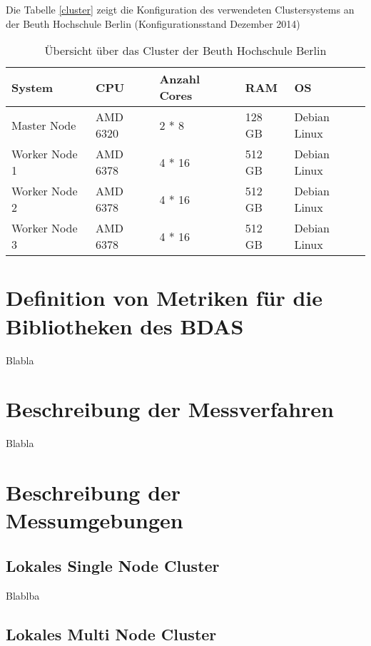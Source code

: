 Die Tabelle \ref{cluster} zeigt die Konfiguration des verwendeten Clustersystems an der Beuth Hochschule Berlin (Konfigurationsstand Dezember 2014)

\begin{table}[!ht]
\centering
\begin{tabular}{| p{3cm} | p{2.2cm} |  p{3cm} |  p{1.2cm} | p{3cm} | }
\hline
System & CPU & Anzahl Cores & RAM & OS\\ \hline \hline
Master Node & AMD 6320 & 2 * 8  & 128 GB & Debian Linux \\ \hline
Worker Node 1 & AMD 6378 & 4 * 16 & 512 GB &  Debian Linux\\ \hline
Worker Node 2 & AMD 6378 & 4 * 16 & 512 GB &  Debian Linux\\ \hline
Worker Node 3 & AMD 6378 & 4 * 16 & 512 GB &  Debian Linux\\ \hline

\end{tabular}
\caption{Übersicht über das Cluster der Beuth Hochschule Berlin}
	\label{tab:cluster}
\end{table}  



\section{Definition von Metriken für die Bibliotheken des BDAS}
\label{section:definition der metriken}

Blabla



\section{Beschreibung der Messverfahren}
\label{section:messumgebungen}

Blabla


\section{Beschreibung der Messumgebungen}
\label{section:messumgebungen}

\subsection{Lokales Single Node Cluster  }
\label{section:lokales single node}

Blablba

\subsection{Lokales Multi Node Cluster}
\label{section:tachyon}


